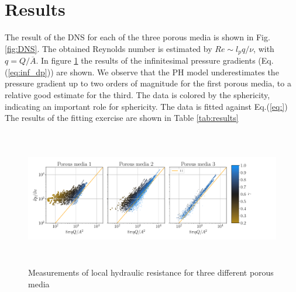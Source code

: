 \documentclass[draft]{agujournal2019}
\begin{document}
\section{Results} 

The result of the DNS for each of the three porous media is shown in Fig.\ref{fig:DNS}. The obtained Reynolds number is estimated by $Re \sim l_p q/\nu$, with $q = Q/\overline{A}$. In figure \ref{fig:local_pressure_drop} the results of the infinitesimal pressure gradients (Eq.(\ref{eq:inf_dp})) are shown. We observe that the PH model underestimates the pressure gradient up to two orders of magnitude for the first porous media, to a relative good estimate for the third. The data is colored by the  sphericity, indicating an important role for sphericity. The data is fitted against Eq.(\ref{eq:}) The results of the fitting exercise are shown in Table \ref{tab:results}


\begin{figure}\label{fig:local_pressure_drop}
\includegraphics[height=6cm]{figures/infi_dpdx_3.pdf}
\caption{Measurements of local hydraulic resistance for three different porous media}
\end{figure}
\end{document}
